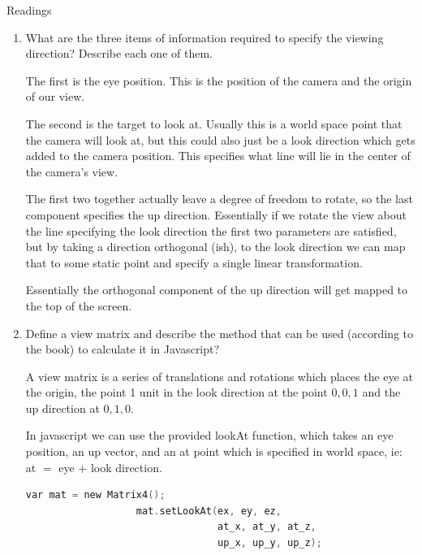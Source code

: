 \documentclass{article}
\begin{document}
    {\large Readings}
    \begin{enumerate}
        \item What are the three items of information required to specify the viewing direction? Describe
            each one of them.
            \begin{mdframed}
                The first is the eye position. This is the position of the camera
                and the origin of our view.

                The second is the target to look at. Usually this is a world space point
                that the camera will look at, but this could also just be a look direction
                which gets added to the camera position. This specifies what line will
                lie in the center of the camera's view.

                The first two together actually leave a degree of freedom
                to rotate, so the last component specifies the up direction.
                Essentially if we rotate the view about the line specifying
                the look direction the first two parameters are satisfied, but
                by taking a direction orthogonal (ish), to the look direction
                we can map that to some static point and specify a single
                linear transformation.

                Essentially the orthogonal component of the up direction will
                get mapped to the top of the screen.
            \end{mdframed}

        \item Define a view matrix and describe the method that can be used (according to the book) to
            calculate it in Javascript?

            \begin{mdframed}
                A view matrix is a series of translations and rotations
                which places the eye at the origin, the point 1 unit in the
                look direction at the point $0,0,1$ and the up direction
                at $0,1,0$.

                In javascript we can use the provided lookAt function,
                which takes an eye position, an up vector, and an at
                point which is specified in world space, ie:
                at $=$ eye $ + $ look direction.

                \begin{lstlisting}[language=C, gobble=16]
                   var mat = new Matrix4(); 
                   mat.setLookAt(ex, ey, ez,
                                 at_x, at_y, at_z,
                                 up_x, up_y, up_z);
                \end{lstlisting}
            \end{mdframed}


\end{enumerate}
\end{document}
